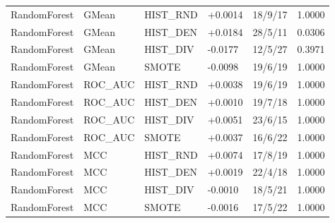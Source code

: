 \documentclass[10pt,a4paper]{article}
\begin{document}
\begin{longtable}{llllrr}
RandomForest & GMean & HIST\_RND & +0.0014 & 18/9/17 & 1.0000 \\
RandomForest & GMean & HIST\_DEN & +0.0184 & 28/5/11 & 0.0306 \\
RandomForest & GMean & HIST\_DIV & -0.0177 & 12/5/27 & 0.3971 \\
RandomForest & GMean & SMOTE & -0.0098 & 19/6/19 & 1.0000 \\
RandomForest & ROC\_AUC & HIST\_RND & +0.0038 & 19/6/19 & 1.0000 \\
RandomForest & ROC\_AUC & HIST\_DEN & +0.0010 & 19/7/18 & 1.0000 \\
RandomForest & ROC\_AUC & HIST\_DIV & +0.0051 & 23/6/15 & 1.0000 \\
RandomForest & ROC\_AUC & SMOTE & +0.0037 & 16/6/22 & 1.0000 \\
RandomForest & MCC & HIST\_RND & +0.0074 & 17/8/19 & 1.0000 \\
RandomForest & MCC & HIST\_DEN & +0.0019 & 22/4/18 & 1.0000 \\
RandomForest & MCC & HIST\_DIV & -0.0010 & 18/5/21 & 1.0000 \\
RandomForest & MCC & SMOTE & -0.0016 & 17/5/22 & 1.0000 \\
\end{longtable}
\endgroup
\clearpage
\end{document}
